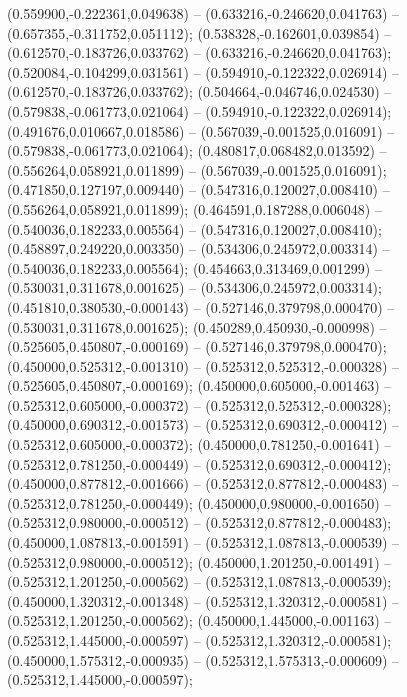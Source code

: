  (0.559900,-0.222361,0.049638) -- (0.633216,-0.246620,0.041763) -- (0.657355,-0.311752,0.051112);
 (0.538328,-0.162601,0.039854) -- (0.612570,-0.183726,0.033762) -- (0.633216,-0.246620,0.041763);
 (0.520084,-0.104299,0.031561) -- (0.594910,-0.122322,0.026914) -- (0.612570,-0.183726,0.033762);
 (0.504664,-0.046746,0.024530) -- (0.579838,-0.061773,0.021064) -- (0.594910,-0.122322,0.026914);
 (0.491676,0.010667,0.018586) -- (0.567039,-0.001525,0.016091) -- (0.579838,-0.061773,0.021064);
 (0.480817,0.068482,0.013592) -- (0.556264,0.058921,0.011899) -- (0.567039,-0.001525,0.016091);
 (0.471850,0.127197,0.009440) -- (0.547316,0.120027,0.008410) -- (0.556264,0.058921,0.011899);
 (0.464591,0.187288,0.006048) -- (0.540036,0.182233,0.005564) -- (0.547316,0.120027,0.008410);
 (0.458897,0.249220,0.003350) -- (0.534306,0.245972,0.003314) -- (0.540036,0.182233,0.005564);
 (0.454663,0.313469,0.001299) -- (0.530031,0.311678,0.001625) -- (0.534306,0.245972,0.003314);
 (0.451810,0.380530,-0.000143) -- (0.527146,0.379798,0.000470) -- (0.530031,0.311678,0.001625);
 (0.450289,0.450930,-0.000998) -- (0.525605,0.450807,-0.000169) -- (0.527146,0.379798,0.000470);
 (0.450000,0.525312,-0.001310) -- (0.525312,0.525312,-0.000328) -- (0.525605,0.450807,-0.000169);
 (0.450000,0.605000,-0.001463) -- (0.525312,0.605000,-0.000372) -- (0.525312,0.525312,-0.000328);
 (0.450000,0.690312,-0.001573) -- (0.525312,0.690312,-0.000412) -- (0.525312,0.605000,-0.000372);
 (0.450000,0.781250,-0.001641) -- (0.525312,0.781250,-0.000449) -- (0.525312,0.690312,-0.000412);
 (0.450000,0.877812,-0.001666) -- (0.525312,0.877812,-0.000483) -- (0.525312,0.781250,-0.000449);
 (0.450000,0.980000,-0.001650) -- (0.525312,0.980000,-0.000512) -- (0.525312,0.877812,-0.000483);
 (0.450000,1.087813,-0.001591) -- (0.525312,1.087813,-0.000539) -- (0.525312,0.980000,-0.000512);
 (0.450000,1.201250,-0.001491) -- (0.525312,1.201250,-0.000562) -- (0.525312,1.087813,-0.000539);
 (0.450000,1.320312,-0.001348) -- (0.525312,1.320312,-0.000581) -- (0.525312,1.201250,-0.000562);
 (0.450000,1.445000,-0.001163) -- (0.525312,1.445000,-0.000597) -- (0.525312,1.320312,-0.000581);
 (0.450000,1.575312,-0.000935) -- (0.525312,1.575313,-0.000609) -- (0.525312,1.445000,-0.000597);
